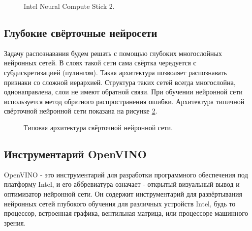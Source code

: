\documentclass[12pt,a4paper]{scrartcl}
\begin{document}
		\begin{figure}[h]
			\caption{Intel Neural Compute Stick 2.}
			\label{fig:NCS1}
		\end{figure}
	
		
	
	\subsection{Глубокие свёрточные нейросети}
	
		Задачу распознавания будем решать с помощью глубоких многослойных нейронных сетей. В слоях такой сети сама свёртка чередуется с субдискретизацией (пулингом). Такая архитектура позволяет распознавать признаки со сложной иерархией. Структура таких сетей всегда многослойна, однонаправлена, слои не имеют обратной связи. При обучении нейронной сети используется метод обратного распространения ошибки. Архитектура типичной свёрточной нейронной сети показана на рисунке \ref{fig:Typical_CNN}\cite{bib:Deep_Conv_Network_Wiki}.
	
		
		\begin{figure}[h]
			\caption{Типовая архитектура свёрточной нейронной сети.}
			\label{fig:Typical_CNN}
		\end{figure}
		
	
	\subsection{Инструментарий OpenVINO}
	
		OpenVINO - это инструментарий для разработки программного обеспечения под платформу Intel, и его аббревиатура означает - открытый визуальный вывод и оптимизатор нейронной сети. Он содержит инструментарий для развёртывания нейронных сетей глубокого обучения для различных устройств Intel, будь то процессор, встроенная графика, вентильная матрица, или процессоре машинного зрения\cite{bib:OpenVINO_Product_Page}.
	
\end{document}
